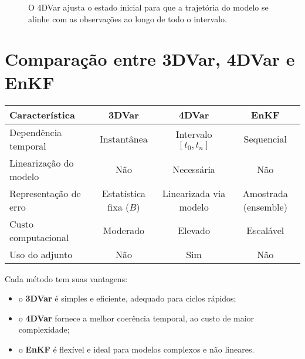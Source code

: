 \begin{figure}[h!]
\centering
{}
\caption{O 4DVar ajusta o estado inicial para que a trajetória do modelo se alinhe com as observações ao longo de todo o intervalo.}
\label{fig:4dvar}
\end{figure}

\section{Comparação entre 3DVar, 4DVar e EnKF}
\begin{center}
\begin{tabular}{lccc}
\toprule
\textbf{Característica} & \textbf{3DVar} & \textbf{4DVar} & \textbf{EnKF} \\
\midrule
Dependência temporal & Instantânea & Intervalo $[t_0,t_n]$ & Sequencial \\
Linearização do modelo & Não & Necessária & Não \\
Representação de erro & Estatística fixa ($B$) & Linearizada via modelo & Amostrada (ensemble) \\
Custo computacional & Moderado & Elevado & Escalável \\
Uso do adjunto & Não & Sim & Não \\
\bottomrule
\end{tabular}
\end{center}

Cada método tem suas vantagens:
\begin{itemize}
  \item o \textbf{3DVar} é simples e eficiente, adequado para ciclos rápidos;
  \item o \textbf{4DVar} fornece a melhor coerência temporal, ao custo de maior complexidade;
  \item o \textbf{EnKF} é flexível e ideal para modelos complexos e não lineares.
\end{itemize}

